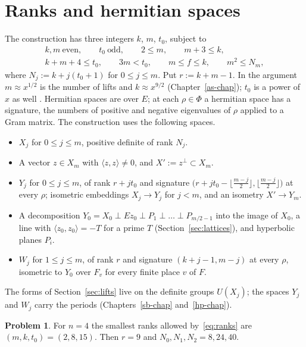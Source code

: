 \documentclass[reqno]{amsart}
\newcounter{chap}
\theoremstyle{definition}
\newtheorem{problem}{Problem}[section]
\theoremstyle{plain}
\theoremstyle{remark}
\begin{document}
\section{Ranks and hermitian spaces}\label{sec:spaces}

The construction has three integers \(k\), \(m\), \(t_0\), subject to
\begin{equation}\label{eq:ranks}
 \begin{gathered}
 k,m\ \text{even},\qquad t_0\ \text{odd},\qquad 2\le m,\qquad m+3\le k,\\
 k+m+4\le t_0,\qquad 3m<t_0,\qquad m\le f\le k,\qquad m^2\le N_m,
 \end{gathered}
\end{equation}
where \(N_j:=k+j(t_0+1)\) for \(0\le j\le m\).  Put \(r:=k+m-1\).  In the argument \(m\approx x^{1/2}\) is the number of lifts and \(k\approx x^{9/2}\) (Chapter~\ref{as-chap}); \(t_0\) is a power of \(x\) as well \cite[\S III.10, \S3]{Rub}.  Hermitian spaces are over \(E\); at each \(\rho\in\Phi\) a hermitian space has a signature, the numbers of positive and negative eigenvalues of \(\rho\) applied to a Gram matrix.  The construction uses the following spaces.
\begin{itemize}
\item[(S1)] \(X_j\) for \(0\le j\le m\), positive definite of rank \(N_j\).
\item[(S2)] A vector \(z\in X_m\) with \(\langle z,z\rangle\ne0\), and \(X':=z^\perp\subset X_m\).
\item[(S3)] \(Y_j\) for \(0\le j\le m\), of rank \(r+jt_0\) and signature \(\bigl(r+jt_0-\lfloor\frac{m-j}2\rfloor,\lfloor\frac{m-j}2\rfloor\bigr)\) at every \(\rho\); isometric embeddings \(X_j\to Y_j\) for \(j<m\), and an isometry \(X'\to Y_m\).
\item[(S4)] A decomposition \(Y_0=X_0\perp Ez_0\perp P_1\perp\dots\perp P_{m/2-1}\) into the image of \(X_0\), a line with \(\langle z_0,z_0\rangle=-T\) for a prime \(T\) (Section~\ref{sec:lattices}), and hyperbolic planes \(P_i\).
\item[(S5)] \(W_j\) for \(1\le j\le m\), of rank \(r\) and signature \((k+j-1,m-j)\) at every \(\rho\), isometric to \(Y_0\) over \(F_v\) for every finite place \(v\) of \(F\).
\end{itemize}
The forms of Section~\ref{sec:lifts} live on the definite groups \(U(X_j)\); the spaces \(Y_j\) and \(W_j\) carry the periods (Chapters~\ref{sb-chap} and~\ref{hp-chap}).

\begin{problem}\label{pr:smallest}
For \(n=4\) the smallest ranks allowed by~\eqref{eq:ranks} are \((m,k,t_0)=(2,8,15)\).  Then \(r=9\) and \(N_0,N_1,N_2=8,24,40\).
\end{problem}
\end{document}
